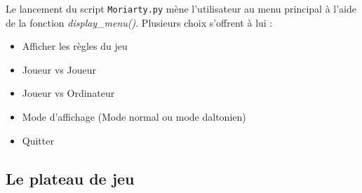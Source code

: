 Le lancement du script \verb|Moriarty.py| mène l’utilisateur au menu principal à l'aide de la fonction  \textit{display\_menu()}. Plusieurs choix s'offrent à lui :
\begin{itemize}
\item Afficher les règles du jeu
\item Joueur vs Joueur
\item Joueur vs Ordinateur  
\item Mode d'affichage (Mode normal ou mode daltonien)
\item Quitter
\end{itemize}


\subsection{Le plateau de jeu }

